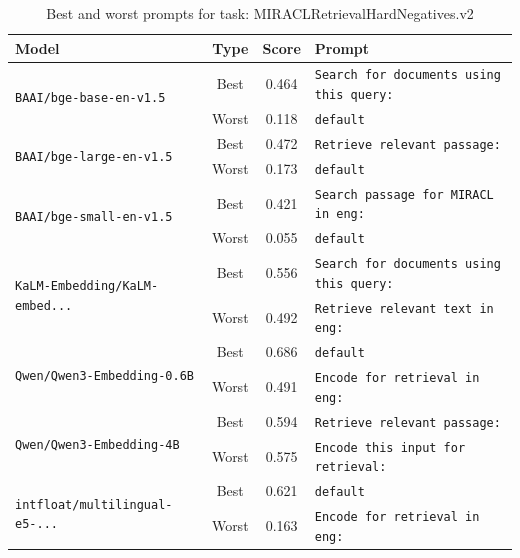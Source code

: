 \begin{table}[t]
\centering
\small
\caption{Best and worst prompts for task: MIRACLRetrievalHardNegatives.v2}
\begin{tabular}{|p{}|c|c|p{}|}
\hline
Model & Type & Score & Prompt \\
\hline
\multirow{2}{=}{\raggedright\texttt{BAAI/\allowbreak bge-\allowbreak base-\allowbreak en-\allowbreak v1.5}} & Best & 0.464 & \texttt{Search for documents using this query:} \\
\cline{2-4}
& Worst & 0.118 & \texttt{default} \\
\hline
\multirow{2}{=}{\raggedright\texttt{BAAI/\allowbreak bge-\allowbreak large-\allowbreak en-\allowbreak v1.5}} & Best & 0.472 & \texttt{Retrieve relevant passage:} \\
\cline{2-4}
& Worst & 0.173 & \texttt{default} \\
\hline
\multirow{2}{=}{\raggedright\texttt{BAAI/\allowbreak bge-\allowbreak small-\allowbreak en-\allowbreak v1.5}} & Best & 0.421 & \texttt{Search passage for MIRACL in eng:} \\
\cline{2-4}
& Worst & 0.055 & \texttt{default} \\
\hline
\multirow{2}{=}{\raggedright\texttt{KaLM-\allowbreak Embedding/\allowbreak KaLM-\allowbreak embed...}} & Best & 0.556 & \texttt{Search for documents using this query:} \\
\cline{2-4}
& Worst & 0.492 & \texttt{Retrieve relevant text in eng:} \\
\hline
\multirow{2}{=}{\raggedright\texttt{Qwen/\allowbreak Qwen3-\allowbreak Embedding-\allowbreak 0.6B}} & Best & 0.686 & \texttt{default} \\
\cline{2-4}
& Worst & 0.491 & \texttt{Encode for retrieval in eng:} \\
\hline
\multirow{2}{=}{\raggedright\texttt{Qwen/\allowbreak Qwen3-\allowbreak Embedding-\allowbreak 4B}} & Best & 0.594 & \texttt{Retrieve relevant passage:} \\
\cline{2-4}
& Worst & 0.575 & \texttt{Encode this input for retrieval:} \\
\hline
\multirow{2}{=}{\raggedright\texttt{intfloat/\allowbreak multilingual-\allowbreak e5-\allowbreak ...}} & Best & 0.621 & \texttt{default} \\
\cline{2-4}
& Worst & 0.163 & \texttt{Encode for retrieval in eng:} \\
\hline
\end{tabular}
\end{table}

